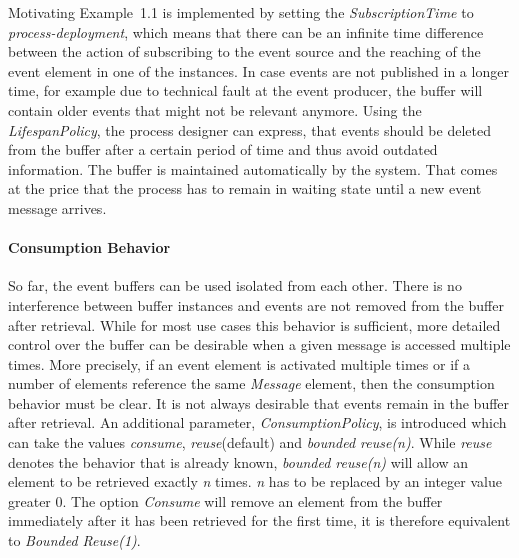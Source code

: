 Motivating Example~1.1 is implemented by setting the \textit{SubscriptionTime} to \textit{process-deployment}, which means that there can be an infinite time difference between the action of subscribing to the event source and the reaching of the event element in one of the instances.
In case events are not published in a longer time, for example due to technical fault at the event producer, the buffer will contain older events that might not be relevant anymore.
Using the \textit{LifespanPolicy}, the process designer can express, that events should be deleted from the buffer after a certain period of time and thus avoid outdated information. The buffer is maintained automatically by the system.
That comes at the price that the process has to remain in waiting state until a new event message arrives.

\paragraph{Consumption Behavior}

So far, the event buffers can be used isolated from each other. There is no interference between buffer instances and events are not removed from the buffer after retrieval.
While for most use cases this behavior is sufficient, more detailed control over the buffer can be desirable when a given message is accessed multiple times. More precisely, if an event element is activated multiple times or if a number of elements reference the same \textit{Message} element, then the consumption behavior must be clear.
It is not always desirable that events remain in the buffer after retrieval.
An additional parameter, \textit{ConsumptionPolicy}, is introduced which can take the values \textit{consume}, \textit{reuse}(default) and \textit{bounded reuse(n)}.
While \textit{reuse} denotes the behavior that is already known, \textit{bounded reuse(n)} will allow an element to be retrieved exactly \textit{n} times. \textit{n} has to be replaced by an integer value greater 0.
The option \textit{Consume} will remove an element from the buffer immediately after it has been retrieved for the first time, it is therefore equivalent to \textit{Bounded Reuse(1)}.

